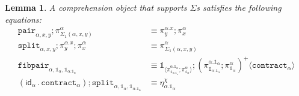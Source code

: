 \documentclass[10pt]{article}
\newtheorem{lemma}{Lemma}
\theoremstyle{definition}
\newcommand{\id}{\mathsf{id}}
\newcommand\bdot[0]{\mathbin{.}}
\newcommand\ApPlus[2]{\ensuremath{{#1}^+ \langle #2 \rangle }}
\newcommand\One{\ensuremath{\mathds{1}}}
\newcommand\ApOne[1]{\ensuremath{\One_{\langle {#1} \rangle }}}
\newcommand\contract[1]{\ensuremath{\mathtt{contract}_{#1}}}
\newcommand\fibpair[1]{\ensuremath{\mathtt{fibpair}_{#1}}}
\newcommand\pair[1]{\ensuremath{\mathtt{pair}_{#1}}}
\newcommand\tsplit[1]{\ensuremath{\mathtt{split}_{#1}}}
\begin{document}
\begin{lemma}
A comprehension object that supports $\Sigma$s satisfies the following equations:
\begin{align}
\pair{\alpha,x,y};\pi^\alpha_{\Sigma_1(\alpha, x, y)} &\equiv \pi^{\alpha.x}_y;\pi^\alpha_x \\
\tsplit{\alpha,x,y};\pi^{\alpha.x}_y;\pi^\alpha_x &\equiv \pi^\alpha_{\Sigma_1(\alpha, x, y)} \\
\fibpair{\alpha,\One_\alpha,\One_{\alpha.\One_\alpha}} &\equiv \ApOne{\pi^{\alpha.\One_\alpha}_{\One_{\alpha.\One_\alpha}};\pi^\alpha_{\One_\alpha}};\ApPlus{(\pi^{\alpha.\One_\alpha}_{\One_{\alpha.\One_\alpha}};\pi^\alpha_{\One_\alpha})}{\contract{\alpha}} \\
(\id_\alpha \bdot \contract{\alpha});\tsplit{\alpha,\One_\alpha,\One_{\alpha.\One_\alpha}} &\equiv \eta^\chi_{\alpha.\One_\alpha}
\end{align}
\end{lemma}
\end{document}
